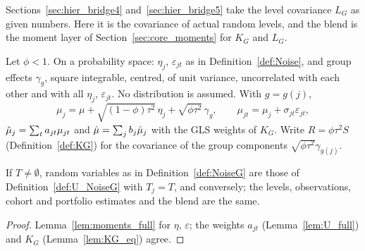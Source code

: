 Sections~\ref{sec:hier_bridge4} and~\ref{sec:hier_bridge5} take the level
covariance $L_G$ as given numbers. Here it is the covariance of actual random
levels, and the blend is the moment layer of Section~\ref{sec:core_moments}
for $K_G$ and $L_G$.

\begin{definition}\label{def:NoiseG}
  \leanok
  Let $\phi < 1$. On a probability space: $\eta_j$, $\varepsilon_{jt}$ as in
  Definition~\ref{def:Noise}, and group effects $\gamma_g$, square integrable,
  centred, of unit variance, uncorrelated with each other and with all
  $\eta_j$, $\varepsilon_{jt}$. No distribution is assumed. With $g = g(j)$,
  \[
    \mu_j = \mu + \sqrt{(1-\phi)\tau^2}\,\eta_j + \sqrt{\phi\tau^2}\,\gamma_g,
    \qquad \mu_{jt} = \mu_j + \sigma_{jt}\varepsilon_{jt},
  \]
  $\hat\mu_j = \sum_t a_{jt}\mu_{jt}$ and $\hat\mu = \sum_j b_j\hat\mu_j$ with the GLS
  weights of $K_G$. Write $R = \phi\tau^2 S$ (Definition~\ref{def:KG}) for the
  covariance of the group components $\sqrt{\phi\tau^2}\gamma_{g(j)}$.
\end{definition}

\begin{lemma}\label{lem:G_toUnequal}
  \leanok
  If $T \ne \emptyset$, random variables as in Definition~\ref{def:NoiseG} are
  those of Definition~\ref{def:U_NoiseG} with $T_j = T$, and conversely; the
  levels, observations, cohort and portfolio estimates and the blend are the
  same.
\end{lemma}
\begin{proof}
  \leanok
  Lemma~\ref{lem:moments_full} for $\eta$, $\varepsilon$; the weights $a_{jt}$
  (Lemma~\ref{lem:U_full}) and $K_G$ (Lemma~\ref{lem:KG_eq}) agree.
\end{proof}

